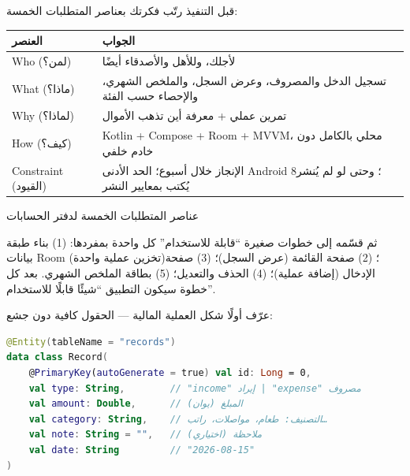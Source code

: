 


قبل التنفيذ رتّب فكرتك بعناصر المتطلبات الخمسة:

\begin{center}
\begin{tabularx}{\linewidth}{|X|X|}
\hline
\textbf{العنصر} & \textbf{الجواب} \tabularnewline
\hline
Who (لمن؟) & لأجلك، وللأهل والأصدقاء أيضًا \tabularnewline
What (ماذا؟) & تسجيل الدخل والمصروف، وعرض السجل، والملخص الشهري، والإحصاء حسب الفئة \tabularnewline
Why (لماذا؟) & تمرين عملي + معرفة أين تذهب الأموال \tabularnewline
How (كيف؟) & Kotlin + Compose + Room + MVVM، محلي بالكامل دون خادم خلفي \tabularnewline
Constraint (القيود) & الإنجاز خلال أسبوع؛ الحد الأدنى Android 8؛ وحتى لو لم يُنشر يُكتب بمعايير النشر \tabularnewline
\hline
\end{tabularx}
\end{center}

\begin{center}\small\color{gray}عناصر المتطلبات الخمسة لدفتر الحسابات\end{center}

ثم قسّمه إلى خطوات صغيرة “قابلة للاستخدام” كل واحدة بمفردها: (1) بناء طبقة بيانات Room (تخزين عملية واحدة)؛ (2) صفحة القائمة (عرض السجل)؛ (3) صفحة الإدخال (إضافة عملية)؛ (4) الحذف والتعديل؛ (5) بطاقة الملخص الشهري. بعد كل خطوة سيكون التطبيق “شيئًا قابلًا للاستخدام”.


عرّف أولًا شكل العملية المالية — الحقول كافية دون جشع:

\begin{lstlisting}[language=Kotlin]
@Entity(tableName = "records")
data class Record(
    @PrimaryKey(autoGenerate = true) val id: Long = 0,
    val type: String,        // "income" إيراد | "expense" مصروف
    val amount: Double,      // المبلغ (يوان)
    val category: String,    // التصنيف: طعام، مواصلات، راتب…
    val note: String = "",   // ملاحظة (اختياري)
    val date: String         // "2026-08-15"
)
\end{lstlisting}

